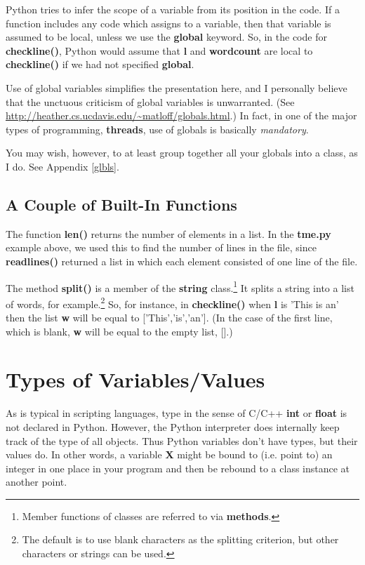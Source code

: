 Python tries to infer the scope of a variable from its position in the
code.  If a function includes any code which assigns to a variable, then
that variable is assumed to be local, unless we use the {\bf global}
keyword.  So, in the code for {\bf checkline()}, Python would assume
that {\bf l} and {\bf wordcount} are local to {\bf checkline()} if we
had not specified {\bf global}.

Use of global variables simplifies the presentation here, and I
personally believe that the unctuous criticism of global variables is
unwarranted.  (See
\url{http://heather.cs.ucdavis.edu/~matloff/globals.html}.)  In fact, in
one of the major types of programming, {\bf threads}, use of globals is
basically {\it mandatory}.  

You may wish, however, to at least group together all your globals into
a class, as I do.  See Appendix \ref{glbls}. 

\subsection{A Couple of Built-In Functions}

The function {\bf len()} returns the number of elements in a list.  In
the {\bf tme.py} example above, we used this to find the number of lines
in the file, since {\bf readlines()} returned a list in which each
element consisted of one line of the file. 

The method {\bf split()} is a member of the {\bf string}
class.\footnote{Member functions of classes are referred to via {\bf
methods}.} It splits a string into a list of words, for
example.\footnote{The default is to use blank characters as the
splitting criterion, but other characters or strings can be used.}  So,
for instance, in {\bf checkline()} when {\bf l} is 'This is an' then the
list {\bf w} will be equal to ['This','is','an'].  (In the case of the
first line, which is blank, {\bf w} will be equal to the empty list,
[].) 

\section{Types of Variables/Values}

As is typical in scripting languages, type in the sense of C/C++ {\bf
int} or {\bf float} is not declared in Python.  However, the Python
interpreter does internally keep track of the type of all objects.  Thus
Python variables don't have types, but their values do.  In other words,
a variable {\bf X} might be bound to (i.e. point to) an integer in one
place in your program and then be rebound to a class instance at another
point.

